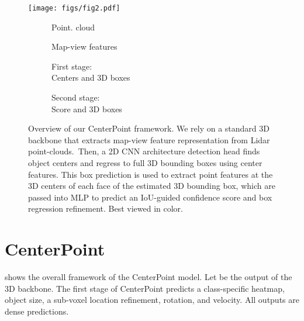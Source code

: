 \documentclass[final]{cvpr}
\begin{document}
\begin{figure*}[t]
\centering
   \vspace{-2em}
   \texttt{[image: figs/fig2.pdf]}
   \begin{subfigure}[b]{.20\linewidth}\caption{Point. cloud}\end{subfigure}\begin{subfigure}[b]{.24\linewidth}\caption{Map-view features}\end{subfigure}\begin{subfigure}[b]{.28\linewidth}\caption{First stage:\\Centers and 3D boxes}\end{subfigure}\begin{subfigure}[b]{.24\linewidth}\caption{Second stage:\\Score and 3D boxes}\end{subfigure}\caption{Overview of our CenterPoint framework. We rely on a standard 3D backbone that extracts map-view feature representation from Lidar point-clouds.~Then, a 2D CNN architecture detection head finds object centers and regress to full 3D bounding boxes using center features. This box prediction is used to extract point features at the 3D centers of each face of the estimated 3D bounding box, which are passed into MLP to predict an IoU-guided confidence score and box regression refinement. Best viewed in color.}
\end{figure*}


\section{CenterPoint}

 shows the overall framework of the CenterPoint model. 
Let  be the output of the 3D backbone.
The first stage of CenterPoint predicts a class-specific heatmap, object size, a sub-voxel location refinement, rotation, and velocity.
All outputs are dense predictions.
\end{document}

